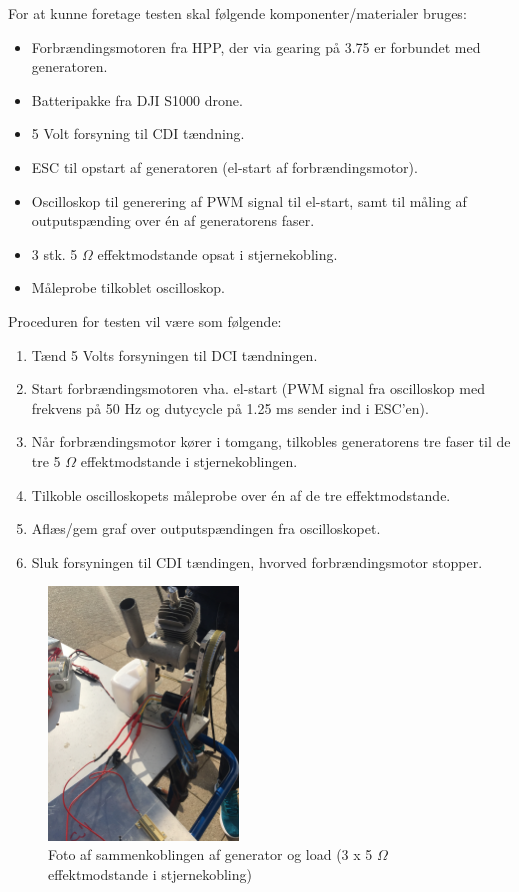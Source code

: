 For at kunne foretage testen skal følgende komponenter/materialer bruges:
\begin{itemize}
\item Forbrændingsmotoren fra HPP, der via gearing på 3.75 er forbundet med generatoren.
\item Batteripakke fra DJI S1000 drone.
\item 5 Volt forsyning til CDI tændning.
\item ESC til opstart af generatoren (el-start af forbrændingsmotor).
\item Oscilloskop til generering af PWM signal til el-start, samt til måling af outputspænding over én af generatorens faser.
\item 3 stk. 5 $\Omega$ effektmodstande opsat i stjernekobling.
\item Måleprobe tilkoblet oscilloskop.
\end{itemize}

Proceduren for testen vil være som følgende:

\begin{enumerate}
\item Tænd 5 Volts forsyningen til DCI tændningen.
\item Start forbrændingsmotoren vha. el-start (PWM signal fra oscilloskop med frekvens på 50 Hz og dutycycle på 1.25 ms sender ind i ESC’en).
\item Når forbrændingsmotor kører i tomgang, tilkobles generatorens tre faser til de tre 5 $\Omega$ effektmodstande i stjernekoblingen.
\item Tilkoble oscilloskopets måleprobe over én af de tre effektmodstande.
\item Aflæs/gem graf over outputspændingen fra oscilloskopet.
\item Sluk forsyningen til CDI tændingen, hvorved forbrændingsmotor stopper.
\end{enumerate}

\begin{figure}[h]
  \centering
  \includegraphics[width=0.45\textwidth]{testsetup2.JPG}
  \caption{Foto af sammenkoblingen af generator og load (3 x 5 $\Omega$ effektmodstande i stjernekobling)}
  \label{fig:testsetup2}
\end{figure}

